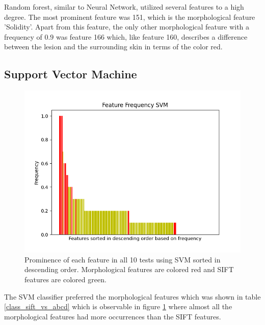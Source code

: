 \documentclass{kththesis}
\begin{document}
Random forest, similar to Neural Network, utilized several features to a high degree. The most prominent feature was 151, which is the morphological feature 'Solidity'. Apart from this feature, the only other morphological feature with a frequency of $0.9$ was feature 166 which, like feature 160, describes a difference between the lesion and the surrounding skin in terms of the color red.


\newpage

\subsection{Support Vector Machine}

\begin{figure}[h!]
  \centering
  \includegraphics[scale=0.8]{figures/svm_all_freqs.png}
  \caption{Prominence of each feature in all 10 tests using SVM sorted in descending order. Morphological features are colored red and SIFT features are colored green.}
  \label{fig:freq_svm}
\end{figure}

The SVM classifier preferred the morphological features which was shown in table \ref{class_sift_vs_abcd} which is observable in figure \ref{fig:freq_svm} where almost all the morphological features had more occurrences than the SIFT features. 

\newpage
\end{document}
